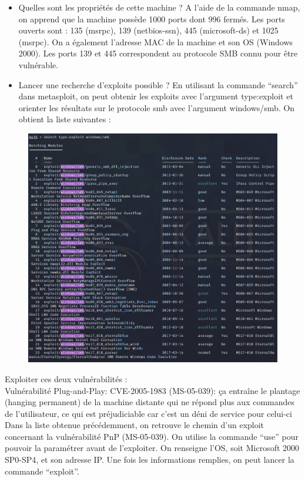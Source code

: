 \documentclass[12pt, oneside]{article}
\begin{document}
\begin{itemize}
\item Quelles sont les propriétés de cette machine ?
A l’aide de la commande nmap, on apprend que la machine possède 1000 ports dont 996 fermés. Les ports ouverts sont : 135 (msrpc), 139 (netbios-ssn), 445 (microsoft-ds) et 1025 (msrpc). On a également l’adresse MAC de la machine et son OS (Windows 2000). 
Les ports 139 et 445 correspondent au protocole SMB connu pour être vulnérable.
\item Lancer une recherche d’exploits possible ?
En utilisant la commande “search” dans metasploit, on peut obtenir les exploits avec l’argument type:exploit et orienter les résultats sur le protocole smb avec l’argument windows/smb. On obtient la liste suivantes :
\end{itemize}
\begin{figure}[H]
\centering
\includegraphics[scale=0.4]{Image2}
\end{figure}
Exploiter ces deux vulnérabilités :\\
Vulnérabilité Plug-and-Play: CVE-2005-1983 (MS-05-039): ça entraîne le plantage (hanging permanent) de la machine distante qui ne répond plus aux commandes de l’utilisateur, ce qui est préjudiciable car c’est un déni de service pour celui-ci
Dans la liste obtenue précédemment, on retrouve le chemin d’un exploit concernant la vulnérabilité PnP (MS-05-039). On utilise la commande “use” pour pouvoir la paramétrer avant de l’exploiter. On renseigne l’OS, soit Microsoft 2000 SP0-SP4, et son adresse IP. Une fois les informations remplies, on peut lancer la commande “exploit”.
\end{document}
